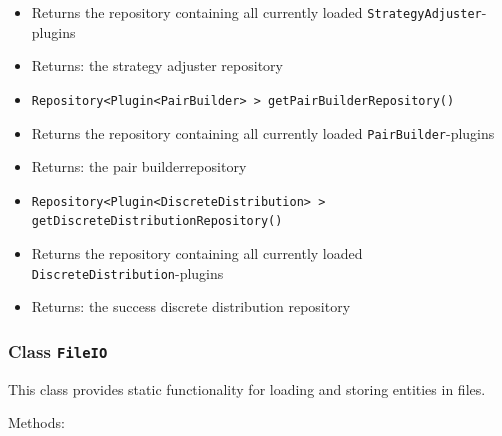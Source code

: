\documentclass[parskip=full,11pt]{scrartcl}
\begin{document}
\begin{itemize}
	\item[]Returns the repository containing all currently loaded \texttt{StrategyAdjuster}-plugins
	\item[] Returns: the strategy adjuster repository
	\item\texttt{Repository<Plugin<PairBuilder>\,> getPairBuilderRepository()}
	\item[]Returns the repository containing all currently loaded \texttt{PairBuilder}-plugins
	\item[] Returns: the pair builderrepository
	\item\texttt{Repository<Plugin<DiscreteDistribution>\,> getDiscreteDistributionRepository()}
	\item[]Returns the repository containing all currently loaded \texttt{DiscreteDistribution}-plugins
	\item[] Returns: the success discrete distribution repository
\end{itemize}

\subsubsection{Class \texttt{FileIO}}

This class provides static functionality for loading and storing entities in files.

Methods:
\end{document}
